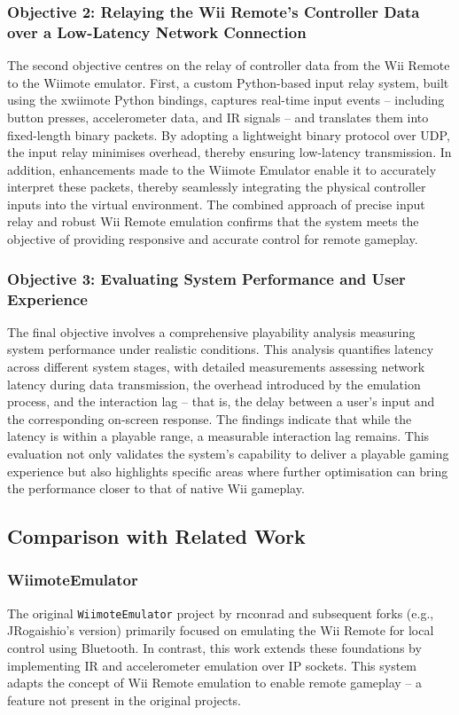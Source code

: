 \subsubsection{Objective 2: Relaying the Wii Remote's Controller Data over a Low-Latency Network Connection}
The second objective centres on the relay of controller data from the Wii Remote
to the Wiimote emulator. First, a custom Python-based input relay system, built
using the xwiimote Python bindings, captures real-time input events -- including
button presses, accelerometer data, and IR signals -- and translates them into
fixed-length binary packets. By adopting a lightweight binary protocol over UDP,
the input relay minimises overhead, thereby ensuring low-latency transmission.
In addition, enhancements made to the Wiimote Emulator enable it to accurately
interpret these packets, thereby seamlessly integrating the physical controller
inputs into the virtual environment. The combined approach of precise input
relay and robust Wii Remote emulation confirms that the system meets the
objective of providing responsive and accurate control for remote gameplay.

\subsubsection{Objective 3: Evaluating System Performance and User Experience}
The final objective involves a comprehensive playability analysis measuring
system performance under realistic conditions. This analysis quantifies latency
across different system stages, with detailed measurements assessing network
latency during data transmission, the overhead introduced by the emulation
process, and the interaction lag\cite{volkerseekerBestPaper} -- that is, the delay between a user’s input
and the corresponding on-screen response. The findings indicate that while the
latency is within a playable range, a measurable interaction lag remains. This
evaluation not only validates the system's capability to deliver a playable
gaming experience but also highlights specific areas where further optimisation
can bring the performance closer to that of native Wii gameplay.


\subsection{Comparison with Related Work}

\subsubsection{WiimoteEmulator}
The original \texttt{WiimoteEmulator} project by rnconrad and subsequent forks
(e.g., JRogaishio's version) primarily focused on emulating the Wii Remote for
local control using Bluetooth. In contrast, this work extends these foundations
by implementing IR and accelerometer emulation over IP sockets. This system adapts the concept of
Wii Remote emulation to enable remote gameplay -- a feature not present in the
original projects.

